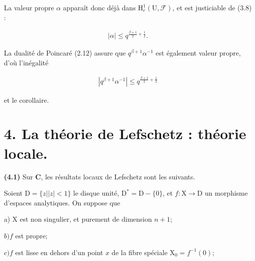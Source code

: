 \documentclass[10pt,leqno]{article}
\begin{document}
\clearpage

\label{physical-16}\par\smallskip

\noindent La valeur propre \(\alpha \) apparaît donc déjà dans \(\mathrm{H}_{c}^{1}(\mathrm{U},\mathcal{F} )\), et est justiciable de (3.8) :\par

\begin{equation*}\begin{gathered}|\alpha | \leq  q^{\frac{\beta+1}{2}+\frac{1}{2}}.\end{gathered}\end{equation*}

\noindent La dualité de Poincaré (2.12) assure que \(q^{\beta +1}\alpha ^{- 1}\) est également valeur propre, d’où l’inégalité\par

\begin{equation*}\begin{gathered}|q^{\beta +1}\alpha ^{- 1}| \leq  q^{\frac{\beta+1}{2}+\frac{1}{2}}\end{gathered}\end{equation*}

\noindent et le corollaire.\par

\section*{4. La théorie de Lefschetz : théorie locale.}

\noindent \textbf{(4.1)} Sur \(\mathbf{C}\), les résultats locaux de Lefschetz sont les suivants.\par

\noindent Soient \(\mathrm{D}=\{z | |z|<1\}\) le disque unité, \(\mathrm{D}^{*}=\mathrm{D}- \{0\}\), et \(f : \mathrm{X}\longrightarrow \mathrm{D}\) un morphisme d’espaces analytiques. On suppose que\par

\noindent a) \(\mathrm{X}\) est non singulier, et purement de dimension \(n+1\);\par

\noindent \(b) f\) est propre;\par

\noindent \(c) f\) est lisse en dehors d’un point \(x\) de la fibre spéciale \(\mathrm{X}_{0}=f^{- 1}(0)\);\par
\end{document}
